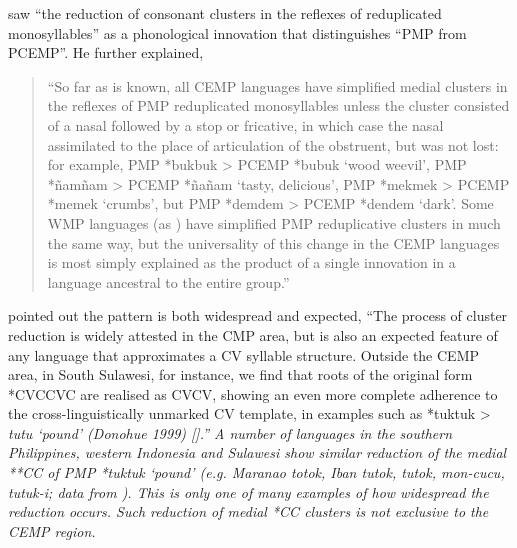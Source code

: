 \citet[246]{Blust1993} saw “the reduction of consonant clusters
in the reflexes of reduplicated monosyllables” as a phonological
innovation that distinguishes “PMP from PCEMP”.
He further explained, 

\begin{quote}
		“So far as is known,
		all CEMP languages have simplified medial clusters in the reflexes
		of PMP reduplicated monosyllables unless the cluster consisted
		of a nasal followed by a stop or fricative,
		in which case the nasal assimilated to the place of articulation
		of the obstruent, but was not lost: for example,
		PMP *bukbuk > PCEMP *bubuk ‘wood weevil’,
		PMP *ñamñam > PCEMP *ñañam ‘tasty,
		delicious’, PMP *mekmek > PCEMP *memek ‘crumbs’,
		but PMP *demdem > PCEMP *dendem ‘dark’.
		Some WMP languages (as ) have simplified PMP reduplicative
		clusters in much the same way,
		but the universality of this change in the CEMP languages is
		most simply explained as the product of a single innovation in
		a language ancestral to the entire group.” \citep[246]{Blust1993}
\end{quote}

\citet[134]{DonohueGrimes2008} pointed out the pattern is both
widespread and expected, “The process of cluster reduction is widely attested
in the CMP area,
but is also an expected feature of any language that approximates
a CV syllable structure.
Outside the CEMP area,
in South Sulawesi, for instance,
we find that roots of the original form
*CVCCVC are realised
as CVCV,
showing an even more complete adherence to the cross-linguistically
unmarked CV template, in examples such as
*tuktuk >  \it{tutu} ‘pound’ (Donohue 1999) [\citealp{Donohue1999a}].”
A number of languages in the southern Philippines,
western Indonesia and Sulawesi show similar reduction of the
medial **CC of PMP *tuktuk ‘pound’ (e.g.
Maranao \it{totok}, Iban \it{tutok},
 \it{tutok},  \it{mon-cucu},
 \it{tutuk-i}; data from \citealp{BlustTrussel2020}).
This is only one of many examples of how widespread the reduction occurs.
Such reduction of medial *CC clusters is not exclusive to the CEMP region.

